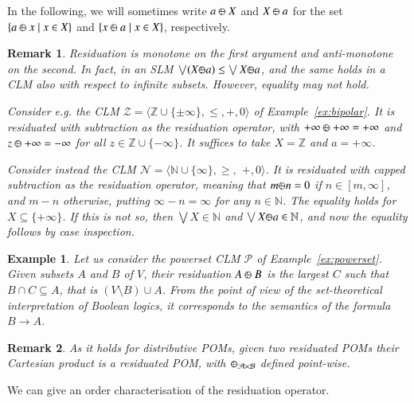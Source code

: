 \documentclass[a4paper]{elsarticle}
\newtheorem{example}{Example}
\newtheorem{remark}{Remark}
\newcommand{\1}{\mathbf{1}}
\def\odiv{{ \ominus\hspace{-8pt}:}\;}
\begin{document}
In the following, we will sometimes write $a \mathbin{\odiv} X$ and $X \mathbin{\odiv}  a$
for the set  $\{a \mathbin{\odiv}  x \mid x \in X\}$ and  $\{x \mathbin{\odiv}  a \mid x \in X\}$,
respectively.

\begin{remark}\label{inverse}
	Residuation is monotone on the first argument and
	anti-monotone on the second. In fact, in an SLM 
	$\bigvee (X \odiv a) \leq \bigvee X \odiv a$,
	and the same holds in a CLM also with respect to infinite subsets.
	However, equality may not hold.

	Consider e.g. the CLM $\mathcal{Z} = \langle \mathbb{Z} \cup \{\pm \infty\}, \leq, +, 0 \rangle$
	of Example~\ref{ex:bipolar}. It is residuated with subtraction as the residuation operator,
	with ${+}\infty \mathbin{\odiv} {+}\infty = {+}\infty$ and  $z \mathbin{\odiv} {+}\infty =  {-}\infty$ for all $z \in  \mathbb{Z} \cup \{{-}\infty\}$.
	It suffices to take $X = \mathbb{Z}$ and $a = {+}\infty$.

	Consider instead the CLM  
	$\mathcal{N} = \langle \mathbb{N} \cup \{\infty\}, \geq,$ $+, 0 \rangle$.
	It is residuated with capped subtraction as the residuation operator,
	meaning that $m \odiv n = 0$ if $n \in [m, \infty]$, and $m - n$ otherwise,
	putting $\infty - n = \infty$ for any $n \in \mathbb{N}$.
%
	The equality holds for $X \subseteq \{{+}\infty\}$. If this is not so, then 
	$\bigvee X \in \mathbb{N}$ and $\bigvee X \odiv a \in \mathbb{N}$,
	and now the equality follows by case inspection.
\end{remark}

\begin{example}
\label{setCLM}
Let us consider the powerset CLM $\mathcal{P}$ of Example~\ref{ex:powerset}. 
Given subsets $A$ and $B$ of $V$, their residuation $A \mathbin{\odiv} B$ 
is the largest $C$ such that $B \cap C \subseteq A$, that is $(V \setminus B) \cup A$. From the point of view
of the set-theoretical interpretation of Boolean logics, it corresponds to the semantics of the formula $B \rightarrow A$.
\end{example}

\begin{remark}
	\label{remarkC}
	As it holds for distributive POMs, given two residuated POMs their Cartesian product
	is a residuated POM, with $\odiv_{\mathcal{A} \times \mathcal{B}}$ defined point-wise.
\end{remark}

We can give an order characterisation of the residuation operator.
\end{document}
